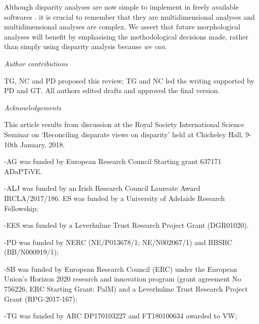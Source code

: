 \documentclass[12pt,letterpaper]{article}
\renewcommand{\subsection}[1]{%
\bigskip
\begin{center}
\begin{large}
\normalfont\itshape #1
\end{large}
\end{center}}
\begin{document}
Although disparity analyses are now simple to implement in freely available softwares \citep{Navarro2003-vz, Bouxin2005-wk, oksanen2007vegan, Harmon2008-gq, lloyd2016, Guillerme2018-uc}.
it is crucial to remember that they are multidimensional analyses and multidimensional analyses are complex.
We assert that future morphological analyses will benefit by emphasising the methodological decisions made, rather than simply using disparity analysis because \textit{we can}.

\subsection{Author contributions}

TG, NC and PD proposed this review; TG and NC led the writing supported by PD and GT. All authors edited drafts and approved the final version.

\subsection{Acknowledgements}

This article results from discussion at the Royal Society International Science Seminar on `Reconciling disparate views on disparity' held at Chicheley Hall, 9-10th January, 2018.

-AG was funded by European Research Council Starting grant 637171 ADaPTiVE.

-ALJ was funded by an Irish Research Council Laureate Award IRCLA/2017/186. ES was funded by a University of Adelaide Research Fellowship;

-EES was funded by a Leverhulme Trust Research Project Grant (DGR01020).

-PD was funded by NERC (NE/P013678/1; NE/N002067/1) and BBSRC (BB/N000919/1);

-SB was funded by European Research Council (ERC) under the European Union's Horizon 2020 research and innovation program (grant agreement No 756226, ERC Starting Grant: PalM) and a Leverhulme Trust Research Project Grant (RPG-2017-167);

-TG was funded by ARC DP170103227 and FT180100634 awarded to VW;




\end{document}
